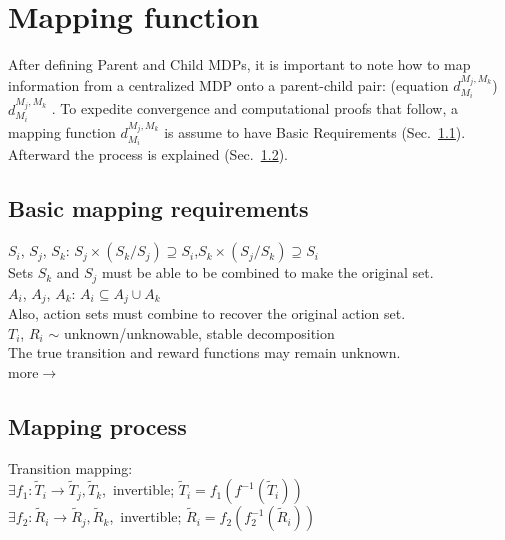\section{Mapping function}
\label{sec:mapping}

After defining Parent and Child MDPs, it is important to note how to map information from a centralized MDP onto a parent-child pair: (equation $d^{M_j, M_k}_{M_i}$) $d^{M_j, M_k}_{M_i}$ . To expedite convergence and computational proofs that follow, a mapping function $d^{M_j, M_k}_{M_i}$ is assume to have Basic Requirements (Sec.~\ref{sec:basicrequirements}). Afterward the process is explained (Sec.~\ref{sec:mappingprocess}).

\subsection{Basic mapping requirements}
\label{sec:basicrequirements}

$S_i$, $S_j$, $S_k$: \quad $S_j \times (S_k/S_j)  \supseteq S_i$,\quad $S_k \times (S_j/S_k) \supseteq S_i$\\

Sets $S_k$ and $S_j$ must be able to be combined to make the original set.\\

$A_i$, $A_j$, $A_k$: \quad $A_i \subseteq A_j\cup A_k$\\

Also, action sets must combine to recover the original action set.\\

$T_i$, $R_i$ $\sim$ unknown/unknowable, stable decomposition\\

The true transition and reward functions may remain unknown.\\

more$\longrightarrow$
\\

\subsection{Mapping process}
\label{sec:mappingprocess}

Transition mapping:\\

$\exists f_1:\tilde{T}_i\to \tilde{T}_j, \tilde{T}_k$,\ invertible; $\tilde{T}_i = f_1\left(f^{-1}\left(\tilde{T}_i\right)\right)$\\
$\exists f_2:\tilde{R}_i\to \tilde{R}_j, \tilde{R}_k$,\ invertible; $\tilde{R}_i = f_2\left(f_2^{-1}\left(\tilde{R}_i\right)\right)$\\

